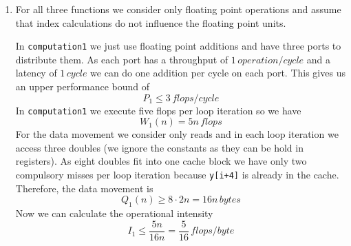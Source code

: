 \documentclass[a4paper]{article}
\begin{document}
\begin{enumerate}
\begin{enumerate}
\begin{center}
                \end{center}
            \item For all three functions we consider only floating point
                operations and assume that index calculations do not influence
                the floating point units.

                In \verb|computation1| we just use floating point additions and
                have three ports to distribute them. As each port has
                a throughput of $1 \, operation/cycle$ and a latency of $1 \,
                cycle$ we can do one addition per cycle on each port. This
                gives us an upper performance bound of
                \begin{equation*}
                    P_1 \leq 3 \, flops/cycle  
                \end{equation*}
                In \verb|computation1| we execute five flops per
                loop iteration so we have
                \begin{equation*}
                    W_1(n) = 5n \, flops                  
                \end{equation*}
                For the data movement we consider only reads and in each loop 
                iteration we access three doubles (we ignore the constants as they 
                can be hold in registers). As eight doubles fit into one 
                cache block we have only two compulsory misses per loop iteration 
                because \verb|y[i+4]| is already in the cache. Therefore, the data
                movement is 
                \begin{equation*}
                    Q_1(n) \geq 8 \cdot 2n = 16n \, bytes
                \end{equation*}
                Now we can calculate the operational intensity
                \begin{equation*}
                    I_1 \leq \frac{5n}{16n} = \frac{5}{16} \,
                    flops/byte
                \end{equation*}


\end{enumerate}
\end{enumerate}
\end{document}
